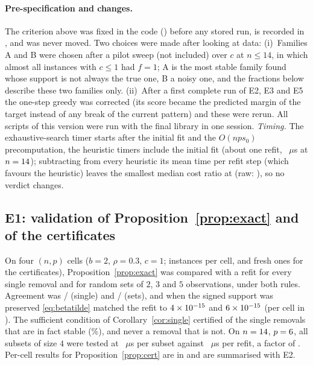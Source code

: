 \documentclass[10pt,a4paper]{article}
\theoremstyle{plain}
\theoremstyle{definition}
\theoremstyle{remark}
\begin{document}
\paragraph{Pre-specification and changes.} The criterion above was fixed in the code () before any stored run, is recorded in , and was never moved. Two choices were made after looking at data: (i)~Families A and B were chosen after a pilot sweep (not included) over $c$ at $n\le14$, in which almost all instances with $c\le1$ had $f=1$; A is the most stable family found whose support is not always the true one, B a noisy one, and the fractions below describe these two families only. (ii)~After a first complete run of E2, E3 and E5 the one-step greedy was corrected (its score became the predicted margin of the target instead of any break of the current pattern) and these were rerun. All scripts of this version were run with the final library in one session. \emph{Timing.} The exhaustive-search timer starts after the initial fit and the $O(nps_0)$ precomputation, the heuristic timers include the initial fit (about one refit, \EoneRefitUs~$\mu$s at $n=14$); subtracting from every heuristic its mean time per refit step (which favours the heuristic) leaves the smallest median cost ratio at \EthreeMinCostAdjusted{} (raw: \EthreeMinCostRaw), so no verdict changes.

\subsection{E1: validation of Proposition~\ref{prop:exact} and of the certificates}
On four $(n,p)$ cells ($b=2$, $\rho=0.3$, $c=1$; \EoneReps{} instances per cell, and \EoneCorInstancesPerCell{} fresh ones for the certificates), Proposition~\ref{prop:exact} was compared with a refit for every single removal and for random sets of $2$, $3$ and $5$ observations, under both rules. Agreement was \EoneSingleAgree/\EoneSingleTests{} (single) and \EoneMultiAgree/\EoneMultiTests{} (sets), and when the signed support was preserved \eqref{eq:betatilde} matched the refit to $4\times 10^{-15}$ and $6\times 10^{-15}$ (per cell in ). The sufficient condition of Corollary~\ref{cor:single} certified \EoneCorCertified{} of the \EoneCorStable{} single removals that are in fact stable (\EoneCorCoverage\%), and never a removal that is not. On $n=14$, $p=6$, all \EoneThroughputSubsets{} subsets of size $4$ were tested at \EoneOracleUs~$\mu$s per subset against \EoneRefitUs~$\mu$s per refit, a factor of \EoneSpeedup. Per-cell results for Proposition~\ref{prop:cert} are in  and are summarised with E2.
\end{document}
